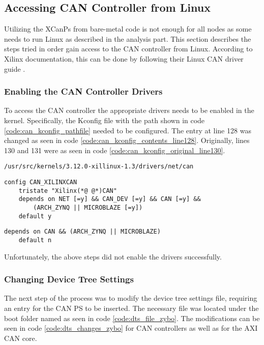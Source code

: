 \subsection{Accessing CAN Controller from Linux}\label{sec:methods_to_implement_can}
Utilizing the XCanPs from bare-metal code is not enough for all nodes as some needs to run Linux as described in the analysis part.
This section describes the steps tried in order gain access to the CAN controller from Linux. 
According to Xilinx documentation, this can be done by following their Linux CAN driver guide \cite{Xilinx_wiki_Linux_CAN_driver}.

\subsubsection*{Enabling the CAN Controller Drivers}
To access the CAN controller the appropriate drivers needs to be enabled in the kernel.
Specifically, the Kconfig file with the path shown in code \ref{code:can_kconfig_pathfile} needed to be configured.
The entry at line 128 was changed as seen in code \ref{code:can_kconfig_contents_line128}.
Originally, lines 130 and 131 were as seen in code \ref{code:can_kconfig_original_line130}.

\begin{lstlisting}[caption={CAN Kconfig pathfile.},numbers=none,label=code:can_kconfig_pathfile]
/usr/src/kernels/3.12.0-xillinux-1.3/drivers/net/can
\end{lstlisting}

\begin{lstlisting}[firstnumber=128,caption={Kconfig file contents from line 128.},label={code:can_kconfig_contents_line128}]
config CAN_XILINXCAN
	tristate "Xilinx(*@ @*)CAN"
	depends on NET [=y] && CAN_DEV [=y] && CAN [=y] && 
        (ARCH_ZYNQ || MICROBLAZE [=y])
	default y
\end{lstlisting}

\begin{lstlisting}[firstnumber=130,caption={Original content of lines 130 and 131.},label={code:can_kconfig_original_line130}]
	depends on CAN && (ARCH_ZYNQ || MICROBLAZE)
	default n
\end{lstlisting}

Unfortunately, the above steps did not enable the drivers successfully.

\subsubsection*{Changing Device Tree Settings}
The next step of the process was to modify the device tree settings file, requiring an entry for the CAN PS to be inserted.
The necessary file was located under the boot folder named as seen in code \ref{code:dts_file_zybo}.
The modifications can be seen in code \ref{code:dts_changes_zybo} for CAN controllers as well as for the AXI CAN core.

